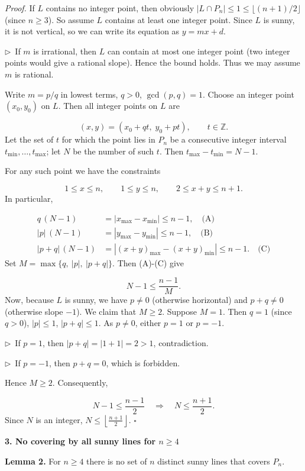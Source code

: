 \documentclass{llmxive}
\providecommand{\solutionheading}[1]{\par\smallskip\noindent\textbf{#1}\par}
\providecommand{\compactbullet}[1]{\par\noindent$\triangleright$~#1\par}
\begin{document}
\emph{Proof.} If \(L\) contains no integer point, then obviously \(|L\cap P_n|\le 1\le\lfloor(n+1)/2\rfloor\) (since \(n\ge 3\)). So assume \(L\) contains at least one integer point. Since \(L\) is sunny, it is not vertical, so we can write its equation as \(y = mx + d\).\par
\compactbullet{If \(m\) is irrational, then \(L\) can contain at most one integer point (two integer points would give a rational slope). Hence the bound holds. Thus we may assume \(m\) is rational.}
Write \(m = p/q\) in lowest terms, \(q>0\), \(\gcd(p,q)=1\). Choose an integer point \((x_0,y_0)\) on \(L\). Then all integer points on \(L\) are\par
\[
(x,y) = (x_0 + q t,\; y_0 + p t),\qquad t\in\mathbb Z.
\]
Let the set of \(t\) for which the point lies in \(P_n\) be a consecutive integer interval \(t_{\min},\dots,t_{\max}\); let \(N\) be the number of such \(t\). Then \(t_{\max}-t_{\min} = N-1\).\par
For any such point we have the constraints\par
\[
1 \le x \le n,\qquad 1 \le y \le n,\qquad 2 \le x+y \le n+1.
\]
In particular,\par
\begin{align*}
q\,(N-1) &= |x_{\max}-x_{\min}| \le n-1, \quad\text{(A)}\\
|p|\,(N-1) &= |y_{\max}-y_{\min}| \le n-1, \quad\text{(B)}\\
|p+q|\,(N-1) &= |(x+y)_{\max}-(x+y)_{\min}| \le n-1. \quad\text{(C)}
\end{align*}
Set \(M = \max\{q,\ |p|,\ |p+q|\}\). Then (A)-(C) give\par
\[
N-1 \le \frac{n-1}{M}.
\]
Now, because \(L\) is sunny, we have \(p \neq 0\) (otherwise horizontal) and \(p+q \neq 0\) (otherwise slope \(-1\)). We claim that \(M \ge 2\). Suppose \(M = 1\). Then \(q = 1\) (since \(q>0\)), \(|p| \le 1\), \(|p+q| \le 1\). As \(p \neq 0\), either \(p = 1\) or \(p = -1\).\par
\compactbullet{If \(p = 1\), then \(|p+q| = |1+1| = 2 > 1\), contradiction.}
\compactbullet{If \(p = -1\), then \(p+q = 0\), which is forbidden.}
Hence \(M \ge 2\). Consequently,\par
\[
N-1 \le \frac{n-1}{2}\quad\Longrightarrow\quad N \le \frac{n+1}{2}.
\]
Since \(N\) is an integer, \(N \le \left\lfloor\frac{n+1}{2}\right\rfloor\). \(\square\)\par
\smallskip
\solutionheading{3. No covering by all sunny lines for \(n \ge 4\)}
\textbf{Lemma 2.} For \(n \ge 4\) there is no set of \(n\) distinct sunny lines that covers \(P_n\).\par
\end{document}
